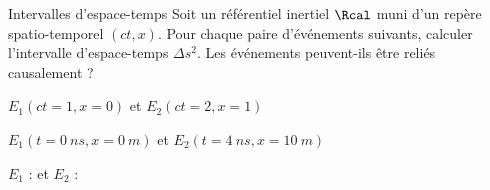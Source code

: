 \begin{exo}[PC][1][appli]{Intervalles d’espace-temps}
  \hauteurLargeurCadreReponse{8mm}{9cm}
  Soit un référentiel inertiel $\Rcal$ muni d’un repère spatio-temporel $(ct,x)$.
  Pour chaque paire d’événements suivants, calculer l’intervalle d’espace-temps $\Delta s^2$. Les événements peuvent-ils être reliés causalement ?
  
  \begin{enonce}
    $E_1(ct=1,x=0)$ et $E_2(ct=2,x=1)$
  \end{enonce}

  \begin{enonce}
    $E_1(t=\SI{0}{ns},x=\SI{0}{m})$ et $E_2(t=\SI{4}{ns},x=\SI{10}{m})$
  \end{enonce}

  \begin{enonce}
    $E_1$ :  et
    $E_2$ :  \dotfill

  \end{enonce}

\end{exo}
